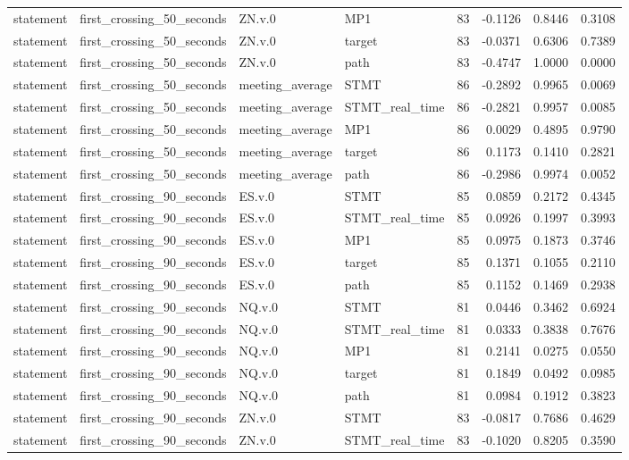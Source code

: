 \begin{tabular}{llllrrrr}
statement & first_crossing_50_seconds & ZN.v.0 & MP1 & 83 & -0.1126 & 0.8446 & 0.3108 \\
statement & first_crossing_50_seconds & ZN.v.0 & target & 83 & -0.0371 & 0.6306 & 0.7389 \\
statement & first_crossing_50_seconds & ZN.v.0 & path & 83 & -0.4747 & 1.0000 & 0.0000 \\
statement & first_crossing_50_seconds & meeting_average & STMT & 86 & -0.2892 & 0.9965 & 0.0069 \\
statement & first_crossing_50_seconds & meeting_average & STMT_real_time & 86 & -0.2821 & 0.9957 & 0.0085 \\
statement & first_crossing_50_seconds & meeting_average & MP1 & 86 & 0.0029 & 0.4895 & 0.9790 \\
statement & first_crossing_50_seconds & meeting_average & target & 86 & 0.1173 & 0.1410 & 0.2821 \\
statement & first_crossing_50_seconds & meeting_average & path & 86 & -0.2986 & 0.9974 & 0.0052 \\
statement & first_crossing_90_seconds & ES.v.0 & STMT & 85 & 0.0859 & 0.2172 & 0.4345 \\
statement & first_crossing_90_seconds & ES.v.0 & STMT_real_time & 85 & 0.0926 & 0.1997 & 0.3993 \\
statement & first_crossing_90_seconds & ES.v.0 & MP1 & 85 & 0.0975 & 0.1873 & 0.3746 \\
statement & first_crossing_90_seconds & ES.v.0 & target & 85 & 0.1371 & 0.1055 & 0.2110 \\
statement & first_crossing_90_seconds & ES.v.0 & path & 85 & 0.1152 & 0.1469 & 0.2938 \\
statement & first_crossing_90_seconds & NQ.v.0 & STMT & 81 & 0.0446 & 0.3462 & 0.6924 \\
statement & first_crossing_90_seconds & NQ.v.0 & STMT_real_time & 81 & 0.0333 & 0.3838 & 0.7676 \\
statement & first_crossing_90_seconds & NQ.v.0 & MP1 & 81 & 0.2141 & 0.0275 & 0.0550 \\
statement & first_crossing_90_seconds & NQ.v.0 & target & 81 & 0.1849 & 0.0492 & 0.0985 \\
statement & first_crossing_90_seconds & NQ.v.0 & path & 81 & 0.0984 & 0.1912 & 0.3823 \\
statement & first_crossing_90_seconds & ZN.v.0 & STMT & 83 & -0.0817 & 0.7686 & 0.4629 \\
statement & first_crossing_90_seconds & ZN.v.0 & STMT_real_time & 83 & -0.1020 & 0.8205 & 0.3590 \\

\end{tabular}
